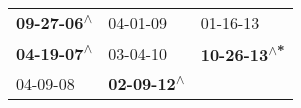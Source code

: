 \begin{supertabular}{lll}
 \textbf{09-27-06\textsuperscript{$\wedge$}} &                   04-01-09\textsuperscript{} &                    01-16-13\textsuperscript{} \\
 \textbf{04-19-07\textsuperscript{$\wedge$}} &                   03-04-10\textsuperscript{} &  \textbf{10-26-13\textsuperscript{$\wedge$*}} \\
                  04-09-08\textsuperscript{} &  \textbf{02-09-12\textsuperscript{$\wedge$}} &                                               \\
\end{supertabular}
